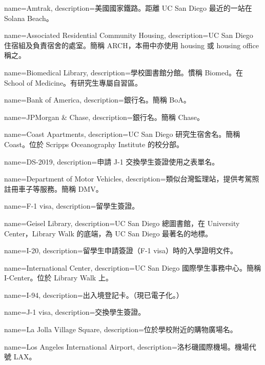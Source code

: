 {
  name={Amtrak},
  description={美國國家鐵路。距離 UC San Diego 最近的一站在 Solana Beach。}
}

{
  name={Associated Residential Community Housing},
  description={UC San Diego 住宿組及負責宿舍的處室。簡稱 ARCH，本冊中亦使用 housing 或 housing office 稱之。}
}

{
  name={Biomedical Library},
  description={學校圖書館分館。慣稱 Biomed。在 School of Medicine。有研究生專屬自習區。}
}

{
  name={Bank of America},
  description={銀行名。簡稱 BoA。}
}

{
  name={JPMorgan \& Chase},
  description={銀行名。簡稱 Chase。}
}

{
  name={Coast Apartments},
  description={UC San Diego 研究生宿舍名。簡稱 Coast。位於 Scripps Oceanography Institute 的校分部。}
}

{
  name={DS-2019},
  description={申請 J-1 交換學生簽證使用之表單名。}
}

{
  name={Department of Motor Vehicles},
  description={類似台灣監理站，提供考駕照註冊車子等服務。簡稱 DMV。}
}

{
  name={F-1 visa},
  description={留學生簽證。}
}

{
  name={Geisel Library},
  description={UC San Diego 總圖書館，在 University Center，Library Walk 的底端，為 UC San Diego 最著名的地標。}
}

{
  name={I-20},
  description={留學生申請簽證（F-1 visa）時的入學證明文件。}
}

{
  name={International Center},
  description={UC San Diego 國際學生事務中心。簡稱 I-Center。位於 Library Walk 上。}
}

{
  name={I-94},
  description={出入境登記卡。（現已電子化。）}
}

{
  name={J-1 visa},
  description={交換學生簽證。}
}

{
  name={La Jolla Village Square},
  description={位於學校附近的購物廣場名。}
}

{
  name={Los Angeles International Airport},
  description={洛杉磯國際機場。機場代號 LAX。}
}

